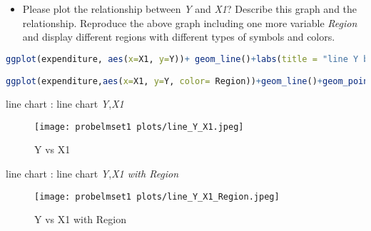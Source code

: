 \documentclass[12pt,letterpaper]{article}
\begin{document}
\begin{itemize}
\begin{lstlisting}[language=R]
ggplot(expenditure, aes(x=Y, fill=Region))+ geom_histogram(binwidth = 6, position = "dodge")+labs(title = "histogram Y by region", x="expenditures on shelter", y="regions") + theme_minimal()

ggplot(expenditure,aes(x=factor(Region), y=Y, fill=factor(Region)))+ geom_bar(stat = "identity")+labs(title = "bar chart Y by region", X="region", y="expenditures")+ theme_minimal()\end{lstlisting}

bar chart  : bar chart \emph{Y},\emph{Region}
\begin{figure}[htp]
    \centering
    \texttt{[image: probelmset1 plots/bar\_Y\_region.jpeg]}
    \caption{Y vs region }
    \label{bar chart region}
\end{figure}
histogram: histogram \emph{Y},\emph{Region}
\begin{figure}[htp]
    \centering
    \texttt{[image: probelmset1 plots/hist\_Y\_region.jpeg]}
    \caption{Y vs region }
    \label{histogram region}
\end{figure}
\newpage
\section*{Description:}
although region 4(west) has the highest per capita expenditures on shelters on the bar chart, region 2(North central) has the most times of expenditure between 75-95

\vspace{.5cm}
\item
Please plot the relationship between \emph{Y} and \emph{X1}? Describe this graph and the relationship. Reproduce the above graph including one more variable \emph{Region} and display different regions with different types of symbols and colors.
\end{itemize}

\begin{lstlisting}[language=R]
ggplot(expenditure, aes(x=X1, y=Y))+ geom_line()+labs(title = "line Y by X1", x="person income", y="expenditures on shelter")+theme_minimal()

ggplot(expenditure,aes(x=X1, y=Y, color= Region))+geom_line()+geom_point(aes(shape= Region), size=6) + labs(title = "line Y by X1&Region", x="person income", y="expenditures on shelter") + theme_minimal()+scale_shape_manual(values = c("1"=0, "2"=1,"3"=2,"4"=5))
\end{lstlisting}

line chart  : line chart \emph{Y},\emph{X1}
\begin{figure}[htp]
    \centering
    \texttt{[image: probelmset1 plots/line\_Y\_X1.jpeg]}
    \caption{Y vs X1 }
    \label{line chart Y vs X1}
\end{figure}
\newpage
line chart  : line chart \emph{Y},\emph{X1 with Region}
\begin{figure}[htp]
    \centering
    \texttt{[image: probelmset1 plots/line\_Y\_X1\_Region.jpeg]}
    \caption{Y vs X1 with Region }
    \label{line chart Y vs X1 with Region}
\end{figure}
\end{document}
